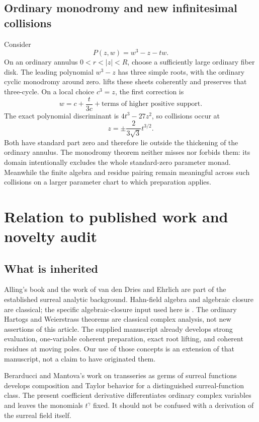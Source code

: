 \documentclass[11pt,oneside]{article}
\numberwithin{equation}{section}
\theoremstyle{definition}
\theoremstyle{remark}\newtheorem{remark}[theorem]{Remark}
\begin{document}
\subsection{Ordinary monodromy and new infinitesimal collisions}
Consider
\[
 P(z,w)=w^3-z-tw.
\]
On an ordinary annulus \(0<r<|z|<R\), choose a sufficiently large ordinary fiber disk. The leading polynomial \(w^3-z\) has three simple roots, with the ordinary cyclic monodromy around zero.  lifts these sheets coherently and preserves that three-cycle. On a local choice \(c^3=z\), the first correction is
\[
 w=c+\frac{t}{3c}+\text{terms of higher positive support}.
\]
The exact polynomial discriminant is \(4t^3-27z^2\), so collisions occur at
\[
 z=\pm\frac{2}{3\sqrt3}t^{3/2}.
\]
Both have standard part zero and therefore lie outside the thickening of the ordinary annulus. The monodromy theorem neither misses nor forbids them: its domain intentionally excludes the whole standard-zero parameter monad. Meanwhile the finite algebra and residue pairing remain meaningful across such collisions on a larger parameter chart to which preparation applies.

\section{Relation to published work and novelty audit}\label{sec:literature}
\subsection{What is inherited}
Alling's book \cite{Alling} and the work of van den Dries and Ehrlich \cite{vdDE} are part of the established surreal analytic background. Hahn-field algebra and algebraic closure are classical; the specific algebraic-closure input used here is \cite[Corollary 4]{Poonen}. The ordinary Hartogs and Weierstrass theorems are classical complex analysis, not new assertions of this article. The supplied manuscript \cite{Source} already develops strong evaluation, one-variable coherent preparation, exact root lifting, and coherent residues at moving poles. Our use of those concepts is an extension of that manuscript, not a claim to have originated them.

Berarducci and Mantova's work on transseries as germs of surreal functions \cite{BM} develops composition and Taylor behavior for a distinguished surreal-function class. The present coefficient derivative differentiates ordinary complex variables and leaves the monomials \(t^\gamma\) fixed. It should not be confused with a derivation of the surreal field itself.
\end{document}
